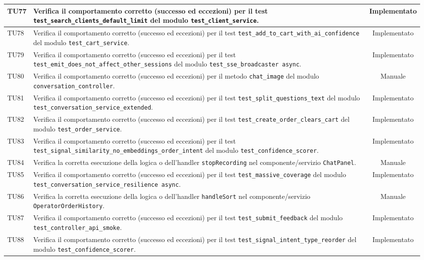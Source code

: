 \documentclass[a4paper,11pt,oneside]{scrartcl}
\begin{document}
\begin{longtable}{|p{1.9cm}|p{11.6cm}|c|}
    TU77 & Verifica il comportamento corretto (successo ed eccezioni) per il test \texttt{test\_search\_clients\_default\_limit} del modulo \texttt{test\_client\_service}. & Implementato \\ \hline
    TU78 & Verifica il comportamento corretto (successo ed eccezioni) per il test \texttt{test\_add\_to\_cart\_with\_ai\_confidence} del modulo \texttt{test\_cart\_service}. & Implementato \\ \hline
    TU79 & Verifica il comportamento corretto (successo ed eccezioni) per il test \texttt{test\_emit\_does\_not\_affect\_other\_sessions} del modulo \texttt{test\_sse\_broadcaster     async}. & Implementato \\ \hline
    TU80 & Verifica il comportamento corretto (successo ed eccezioni) per il metodo \texttt{chat\_image} del modulo \texttt{conversation\_controller}. & Manuale \\ \hline
    TU81 & Verifica il comportamento corretto (successo ed eccezioni) per il test \texttt{test\_split\_questions\_text} del modulo \texttt{test\_conversation\_service\_extended}. & Implementato \\ \hline
    TU82 & Verifica il comportamento corretto (successo ed eccezioni) per il test \texttt{test\_create\_order\_clears\_cart} del modulo \texttt{test\_order\_service}. & Implementato \\ \hline
    TU83 & Verifica il comportamento corretto (successo ed eccezioni) per il test \texttt{test\_signal\_similarity\_no\_embeddings\_order\_intent} del modulo \texttt{test\_confidence\_scorer}. & Implementato \\ \hline
    TU84 & Verifica la corretta esecuzione della logica o dell'handler \texttt{stopRecording} nel componente/servizio \texttt{ChatPanel}. & Manuale \\ \hline
    TU85 & Verifica il comportamento corretto (successo ed eccezioni) per il test \texttt{test\_massive\_coverage} del modulo \texttt{test\_conversation\_service\_resilience async}. & Implementato \\ \hline
    TU86 & Verifica la corretta esecuzione della logica o dell'handler \texttt{handleSort} nel componente/servizio \texttt{OperatorOrderHistory}. & Manuale \\ \hline
    TU87 & Verifica il comportamento corretto (successo ed eccezioni) per il test \texttt{test\_submit\_feedback} del modulo \texttt{test\_controller\_api\_smoke}. & Implementato \\ \hline
    TU88 & Verifica il comportamento corretto (successo ed eccezioni) per il test \texttt{test\_signal\_intent\_type\_reorder} del modulo \texttt{test\_confidence\_scorer}. & Implementato \\ \hline

\end{longtable}
\end{document}

